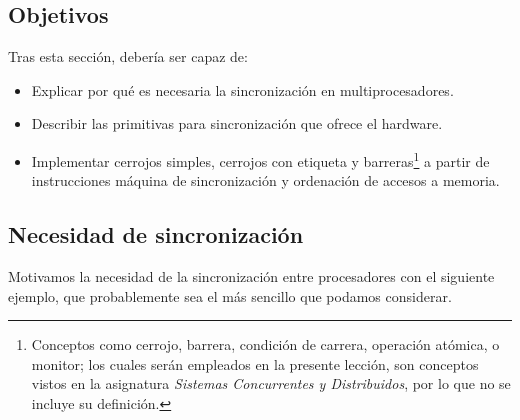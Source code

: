 \subsection{Objetivos}
Tras esta sección, debería ser capaz de:
\begin{itemize}
    \item Explicar por qué es necesaria la sincronización en multiprocesadores.
    \item Describir las primitivas para sincronización que ofrece el hardware.
    \item Implementar cerrojos simples, cerrojos con etiqueta y barreras\footnote{Conceptos como cerrojo, barrera, condición de carrera, operación atómica, o monitor; los cuales serán empleados en la presente lección, son conceptos vistos en la asignatura \emph{Sistemas Concurrentes y Distribuidos}, por lo que no se incluye su definición.} a partir de instrucciones máquina de sincronización y ordenación de accesos a memoria.
\end{itemize}

\subsection{Necesidad de sincronización}
Motivamos la necesidad de la sincronización entre procesadores con el siguiente ejemplo, que probablemente sea el más sencillo que podamos considerar.

